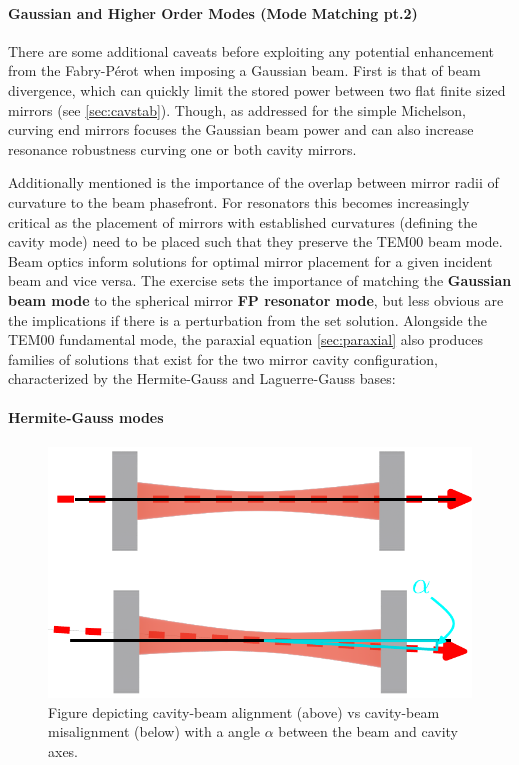 \paragraph{Gaussian and Higher Order Modes (Mode Matching pt.2)}\label{subsubsubsubsec:mm2}

There are some additional caveats before exploiting any potential enhancement from the Fabry-P\'erot when imposing a Gaussian beam. First is that of beam divergence, which can quickly limit the stored power between two flat finite sized mirrors (see \autoref{sec:cavstab}). Though, as addressed for the simple Michelson, curving end mirrors focuses the Gaussian beam power and can also increase resonance robustness curving one or both cavity mirrors. 

Additionally mentioned is the importance of the overlap between mirror radii of curvature to the beam phasefront. For resonators this becomes increasingly critical as the placement of mirrors with established curvatures (defining the cavity mode) need to be placed such that they preserve the TEM00 beam mode. Beam optics inform solutions for optimal mirror placement for a given incident beam and vice versa. The exercise sets the importance of matching the \textbf{Gaussian beam mode} to the spherical mirror \textbf{FP resonator mode}, but less obvious are the implications if there is a perturbation from the set solution. Alongside the TEM00 fundamental mode, the paraxial equation \autoref{sec:paraxial} also produces families of solutions that exist for the two mirror cavity configuration, characterized by the Hermite-Gauss and Laguerre-Gauss bases:

\paragraph*{Hermite-Gauss modes}

\begin{figure}[H]
	\centering
	\includegraphics[width=.7\textwidth]{figs/INTRO/FP_misalignment.pdf}
	\caption{Figure depicting cavity-beam alignment (above) vs cavity-beam misalignment (below) with a angle $\alpha$ between the beam and cavity axes. }
	\label{fig:fp_misalignment}
\end{figure}

